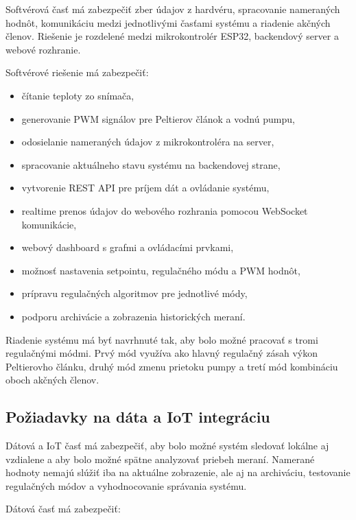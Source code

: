 Softvérová časť má zabezpečiť zber údajov z hardvéru, spracovanie nameraných hodnôt, komunikáciu 
medzi jednotlivými časťami systému a riadenie akčných členov. Riešenie je rozdelené medzi 
mikrokontrolér ESP32, backendový server a webové rozhranie.

Softvérové riešenie má zabezpečiť:

\begin{itemize}
    \item čítanie teploty zo snímača,
    \item generovanie PWM signálov pre Peltierov článok a vodnú pumpu,
    \item odosielanie nameraných údajov z mikrokontroléra na server,
    \item spracovanie aktuálneho stavu systému na backendovej strane,
    \item vytvorenie REST API pre príjem dát a ovládanie systému,
    \item realtime prenos údajov do webového rozhrania pomocou WebSocket komunikácie,
    \item webový dashboard s grafmi a ovládacími prvkami,
    \item možnosť nastavenia setpointu, regulačného módu a PWM hodnôt,
    \item prípravu regulačných algoritmov pre jednotlivé módy,
    \item podporu archivácie a zobrazenia historických meraní.
\end{itemize}

Riadenie systému má byť navrhnuté tak, aby bolo možné pracovať s tromi regulačnými módmi. 
Prvý mód využíva ako hlavný regulačný zásah výkon Peltierovho článku, druhý mód zmenu prietoku pumpy a 
tretí mód kombináciu oboch akčných členov.

\subsection{Požiadavky na dáta a IoT integráciu}

Dátová a IoT časť má zabezpečiť, aby bolo možné systém sledovať lokálne aj vzdialene a aby bolo možné 
spätne analyzovať priebeh meraní. Namerané hodnoty nemajú slúžiť iba na aktuálne zobrazenie, 
ale aj na archiváciu, testovanie regulačných módov a vyhodnocovanie správania systému.

Dátová časť má zabezpečiť:

